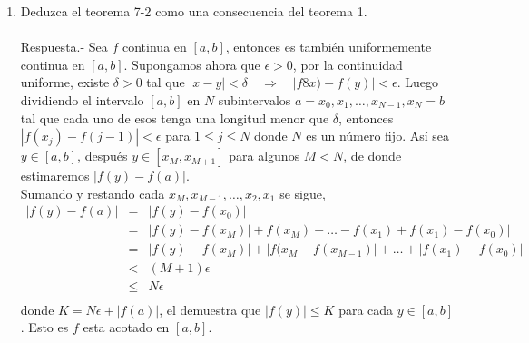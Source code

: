 \begin{enumerate}[\bfseries 1.]
    \item Deduzca el teorema 7-2 como una consecuencia del teorema 1.\\\\
	Respuesta.-\; Sea $f$ continua en $[a,b]$, entonces es también uniformemente continua en $[a,b]$. Supongamos ahora que $\epsilon>0$, por la continuidad uniforme, existe $\delta>0$ tal que $|x-y|<\delta\quad \Rightarrow \quad |f8x)-f(y)|<\epsilon.$ Luego dividiendo el intervalo $[a,b]$ en $N$ subintervalos $a=x_0,x_1,\ldots, x_{N-1},x_N=b$ tal que cada uno de esos tenga una longitud menor que $\delta$, entonces $|f(x_j)-f(j-1)|<\epsilon$ para $1\leq j\leq N$ donde $N$ es un número fijo. Así sea $y\in [a,b]$, después $y\in[x_M,x_{M+1}]$ para algunos $M<N$, de donde estimaremos $|f(y)-f(a)|$.\\
	Sumando y restando cada $x_M,x_{M-1},\ldots,x_2,x_1$ se sigue,
	$$\begin{array}{rcl}
	    |f(y)-f(a)| &=& |f(y)-f(x_0)|\\
			&=&|f(y)-f(x_M)|+f(x_M)-\ldots - f(x_1)+f(x_1)-f(x_0)|\\
			&=&|f(y)-f(x_M)|+|f(x_M-f(x_{M-1})|+\ldots + |f(x_1)-f(x_0)|\\
			&<&(M+1)\epsilon\\
			&\leq& N\epsilon\\
	\end{array}$$
	donde $K=N\epsilon+|f(a)|$, el demuestra que $|f(y)|\leq K$ para cada $y\in [a,b]$. Esto es $f$ esta acotado en $[a,b]$.\\\\

\end{enumerate}

